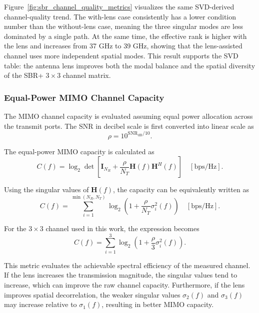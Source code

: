 \documentclass[10pt]{article}
\begin{document}
Figure~\ref{fig:sbr_channel_quality_metrics} visualizes the same SVD-derived channel-quality trend.
The with-lens case consistently has a lower condition number than the without-lens case, meaning the
three singular modes are less dominated by a single path. At the same time, the effective rank is
higher with the lens and increases from 37 GHz to 39 GHz, showing that the lens-assisted channel uses
more independent spatial modes. This result supports the SVD table: the antenna lens improves both
the modal balance and the spatial diversity of the SBR+ \(3\times3\) channel matrix.

\subsubsection{Equal-Power MIMO Channel Capacity}

The MIMO channel capacity is evaluated assuming equal power allocation across the transmit ports. 
The SNR in decibel scale is first converted into linear scale as
\begin{equation}
    \rho
    =
    10^{\mathrm{SNR}_{\mathrm{dB}}/10}.
\end{equation}

The equal-power MIMO capacity is calculated as
\begin{equation}
    C(f)
    =
    \log_2
    \det
    \left[
    \mathbf{I}_{N_R}
    +
    \frac{\rho}{N_T}
    \mathbf{H}(f)\mathbf{H}^{H}(f)
    \right]
    \quad
    [\mathrm{bps/Hz}].
\end{equation}

Using the singular values of \(\mathbf{H}(f)\), the capacity can be equivalently written as
\begin{equation}
    C(f)
    =
    \sum_{i=1}^{\min(N_R,N_T)}
    \log_2
    \left(
    1+
    \frac{\rho}{N_T}
    \sigma_i^2(f)
    \right)
    \quad
    [\mathrm{bps/Hz}].
\end{equation}

For the \(3 \times 3\) channel used in this work, the expression becomes
\begin{equation}
    C(f)
    =
    \sum_{i=1}^{3}
    \log_2
    \left(
    1+
    \frac{\rho}{3}
    \sigma_i^2(f)
    \right).
\end{equation}

This metric evaluates the achievable spectral efficiency of the measured channel. 
If the lens increases the transmission magnitude, the singular values tend to increase, which can improve the raw channel capacity. 
Furthermore, if the lens improves spatial decorrelation, the weaker singular values \(\sigma_2(f)\) and \(\sigma_3(f)\) may increase relative to \(\sigma_1(f)\), resulting in better MIMO capacity.
\end{document}
